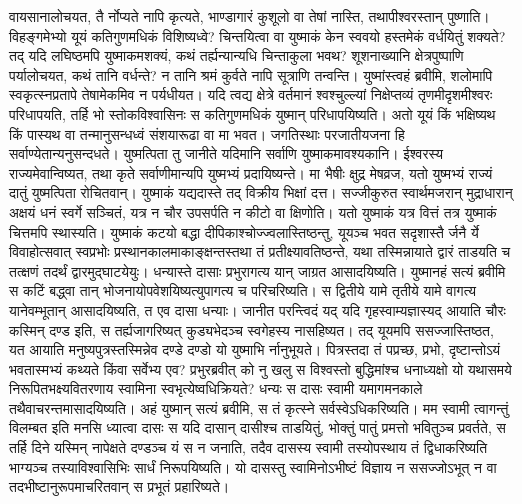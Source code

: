 \vakya वायसानालोचयत, तै र्नोप्यते नापि कृत्यते, भाण्डागारं कुशूलो वा तेषां नास्ति, तथापीश्वरस्तान् पुष्णाति। विहङ्गमेभ्यो यूयं कतिगुणमधिकं विशिष्यध्वे?
\vakya चिन्तयित्वा वा युष्माकं केन स्ववयो हस्तमेकं वर्धयितुं शक्यते?
\vakya तद् यदि लघिष्ठमपि युष्माकमशक्यं, कथं तर्ह्यन्यान्यधि चिन्ताकुला भवथ?
\vakya शूशनाख्यानि क्षेत्रपुष्पाणि पर्यालोचयत, कथं तानि वर्धन्ते? न तानि श्रमं कुर्वते नापि सूत्राणि तन्वन्ति। युष्मांस्त्वहं ब्रवीमि, शलोमापि स्वकृत्स्नप्रतापे तेषामेकमिव न पर्यधीयत।
\vakya यदि त्वद्य क्षेत्रे वर्तमानं श्वश्चुल्ल्यां निक्षेप्तव्यं तृणमीदृशमीश्वरः परिधापयति, तर्हि भो स्तोकविश्वासिनः स कतिगुणमधिकं युष्मान् परिधापयिष्यति।
\vakya अतो यूयं किं भक्षिष्यथ किं पास्यथ वा तन्मानुसन्धध्वं संशयारूढा वा मा भवत।
\vakya जगतिस्थाः परजातीयजना हि सर्वाण्येतान्यनुसन्दधते। युष्मत्पिता तु जानीते यदिमानि सर्वाणि युष्माकमावश्यकानि।
\vakya ईश्वरस्य राज्यमेवान्विष्यत, तथा कृते सर्वाणीमान्यपि युष्मभ्यं प्रदायिष्यन्ते।
\vakya मा भैषीः क्षुद्र मेषव्रज, यतो युष्मभ्यं राज्यं दातुं युष्मत्पिता रोचितवान्। युष्माकं यद्यदास्ते तद् विक्रीय भिक्षां दत्त।
\vakya सज्जीकुरुत स्वार्थमजरान् मुद्राधारान् अक्षयं धनं स्वर्गे सञ्चितं, यत्र न चौर उपसर्पति न कीटो वा क्षिणोति।
\vakya यतो युष्माकं यत्र वित्तं तत्र युष्माकं चित्तमपि स्थास्यति।
\vakya युष्माकं कटयो बद्धा दीपिकाश्चोज्ज्वलास्तिष्ठन्तु,
\vakya यूयञ्च भवत सदृशास्तै र्जनै र्ये विवाहोत्सवात् स्वप्रभोः प्रस्थानकालमाकाङ्क्षन्तस्तथा तं प्रतीक्ष्यावतिष्ठन्ते, यथा तस्मिन्नायाते द्वारं ताडयति च तत्क्षणं तदर्थं द्वारमुद्घाटयेयुः।
\vakya धन्यास्ते दासाः प्रभुरागत्य यान् जाग्रत आसादयिष्यति। युष्मानहं सत्यं ब्रवीमि स कटिं बद्ध्वा तान् भोजनायोपवेशयिष्यत्युपागत्य च परिचरिष्यति।
\vakya स द्वितीये यामे तृतीये यामे वागत्य यानेवम्भूतान् आसादयिष्यति, त एव दासा धन्याः।
\vakya जानीत परन्त्विदं यद् यदि गृहस्वाम्यज्ञास्यद् आयाति चौरः कस्मिन् दण्ड इति, स तर्ह्यजागरिष्यत् कुड्यभेदञ्च स्वगेहस्य नासहिष्यत।
\vakya तद् यूयमपि ससज्जास्तिष्ठत, यत आयाति मनुष्यपुत्रस्तस्मिन्नेव दण्डे दण्डो यो युष्माभि र्नानुभूयते।
\vakya पित्रस्तदा तं पप्रच्छ, प्रभो, दृष्टान्तोऽयं भवतास्मभ्यं कथ्यते किंवा सर्वेभ्य एव?
\vakya प्रभुरब्रवीत् को नु खलु स विश्वस्तो बुद्धिमांश्च धनाध्यक्षो यो यथासमये निरूपितभक्ष्यवितरणाय स्वामिना स्वभृत्येष्वधिक्रियते?
\vakya धन्यः स दासः स्वामी यमागमनकाले तथैवाचरन्तमासादयिष्यति।
\vakya अहं युष्मान् सत्यं ब्रवीमि, स तं कृत्स्ने सर्वस्वेऽधिकरिष्यति।
\vakya मम स्वामी त्वागन्तुं विलम्बत इति मनसि ध्यात्वा दासः स यदि दासान् दासीश्च ताडयितुं, भोक्तुं पातुं प्रमत्तो भवितुञ्च प्रवर्तते,
\vakya स तर्हि दिने यस्मिन् नापेक्षते दण्डञ्च यं स न जनाति, तदैव दासस्य स्वामी तस्योपस्थाय तं द्विधाकरिष्यति भाग्यञ्च तस्याविश्वासिभिः सार्धं निरूपयिष्यति।
\vakya यो दासस्तु स्वामिनोऽभीष्टं विज्ञाय न ससज्जोऽभूत् न वा तदभीष्टानुरूपमाचरितवान् स प्रभूतं प्रहारिष्यते।
